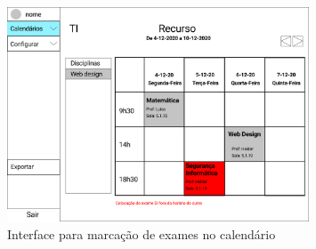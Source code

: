 \documentclass[11pt, twoside]{report}
\begin{document}
	
	\begin{figure}[H] 
		\centering 
		\includegraphics[width=0.8\textwidth,height=0.8\textheight,keepaspectratio]{image/prototipowireframes/calendarioaviso}
		\caption{Interface para marcação de exames no calendário}
		\label{interfacemarcarexame}
	\end{figure}
	
	
	
\end{document}
